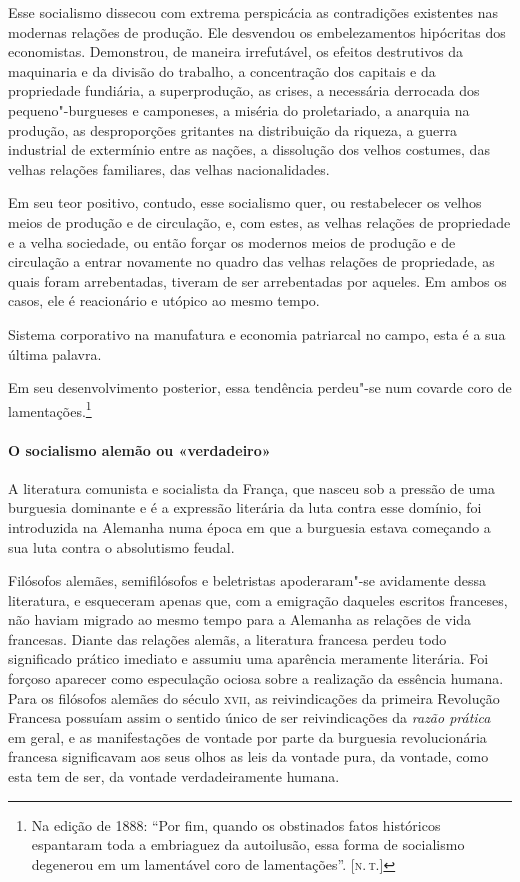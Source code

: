 Esse socialismo dissecou com extrema perspicácia as contradições
existentes nas modernas relações de produção. Ele desvendou os
embelezamentos hipócritas dos economistas. Demonstrou, de maneira
irrefutável, os efeitos destrutivos da maquinaria e da divisão do
trabalho, a concentração dos capitais e da propriedade fundiária, a
superprodução, as crises, a necessária derrocada dos pequeno"-burgueses
e camponeses, a miséria do proletariado, a anarquia na produção, as
desproporções gritantes na distribuição da riqueza, a guerra industrial
de extermínio entre as nações, a dissolução dos velhos costumes, das
velhas relações familiares, das velhas nacionalidades.

Em seu teor positivo, contudo, esse socialismo quer, ou restabelecer os
velhos meios de produção e de circulação, e, com estes, as velhas
relações de propriedade e a velha sociedade, ou então forçar os
modernos meios de produção e de circulação a entrar novamente no quadro
das velhas relações de propriedade, as quais foram arrebentadas,
tiveram de ser arrebentadas por aqueles. Em ambos os casos, ele é
reacionário e utópico ao mesmo tempo.

Sistema corporativo na manufatura e economia patriarcal no campo, esta é
a sua última palavra.

Em seu desenvolvimento posterior, essa tendência perdeu"-se num
covarde coro de lamentações.\footnote{Na edição de 1888: ``Por fim, quando os obstinados fatos históricos espantaram toda a embriaguez da autoilusão, essa forma de
socialismo degenerou em um lamentável coro de lamentações''. [\textsc{n.\,t.}]}

\paragraph{O socialismo alemão ou «verdadeiro»}

A literatura comunista e socialista da França, que nasceu sob a pressão
de uma burguesia dominante e é a expressão literária da luta contra
esse domínio, foi introduzida na Alemanha numa época em que a burguesia
estava começando a sua luta contra o absolutismo feudal.

Filósofos alemães, semifilósofos e beletristas apoderaram"-se
avidamente dessa literatura, e esqueceram apenas que, com a emigração
daqueles escritos franceses, não haviam migrado ao mesmo tempo para a
Alemanha as relações de vida francesas. Diante das relações alemãs, a
literatura francesa perdeu todo significado prático imediato e assumiu
uma aparência meramente literária. Foi forçoso aparecer como
especulação ociosa sobre a realização da essência humana. Para os
filósofos alemães do século \textsc{xvii}, as reivindicações da primeira
Revolução Francesa possuíam assim o sentido único de ser reivindicações
da \textit{razão prática} em geral, e as manifestações de vontade por parte da
burguesia revolucionária francesa significavam aos seus olhos as leis
da vontade pura, da vontade, como esta tem de ser, da vontade
verdadeiramente humana.

